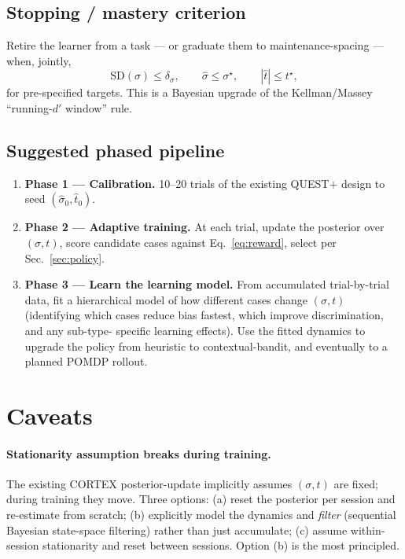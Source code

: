 \documentclass[11pt]{article}
\begin{document}
\subsection{Stopping / mastery criterion}
Retire the learner from a task — or graduate them to
maintenance-spacing — when, jointly,
\begin{equation}
  \mathrm{SD}(\sigma) \le \delta_\sigma,\qquad
  \hat\sigma \le \sigma^\star,\qquad
  |\hat t| \le t^\star,
\end{equation}
for pre-specified targets. This is a Bayesian upgrade of the
Kellman/Massey ``running-$d'$ window'' rule.

\subsection{Suggested phased pipeline}
\begin{enumerate}[leftmargin=*,itemsep=2pt]
  \item \textbf{Phase 1 — Calibration.} 10--20 trials of the existing
        QUEST$+$ design to seed $(\hat\sigma_0, \hat t_0)$.
  \item \textbf{Phase 2 — Adaptive training.} At each trial, update
        the posterior over $(\sigma,t)$, score candidate cases against
        Eq.~\ref{eq:reward}, select per Sec.~\ref{sec:policy}.
  \item \textbf{Phase 3 — Learn the learning model.} From accumulated
        trial-by-trial data, fit a hierarchical model of how different
        cases change $(\sigma,t)$ (identifying which cases reduce bias
        fastest, which improve discrimination, and any sub-type-
        specific learning effects). Use the fitted dynamics to
        upgrade the policy from heuristic to contextual-bandit, and
        eventually to a planned POMDP rollout.
\end{enumerate}

\section{Caveats}
\label{sec:caveats}

\paragraph{Stationarity assumption breaks during training.} The
existing CORTEX posterior-update implicitly assumes $(\sigma,t)$ are
fixed; during training they move. Three options: (a) reset the
posterior per session and re-estimate from scratch; (b) explicitly
model the dynamics and \emph{filter} (sequential Bayesian state-space
filtering) rather than just accumulate; (c) assume within-session
stationarity and reset between sessions. Option (b) is the most
principled.
\end{document}

